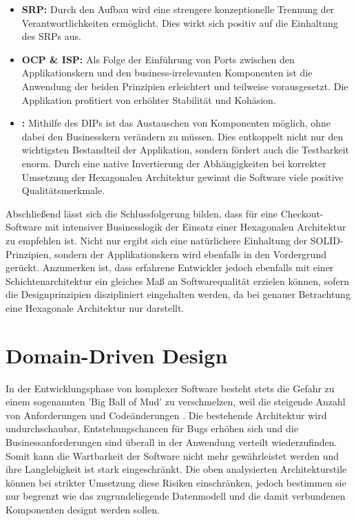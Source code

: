 \begin{itemize}[noitemsep,nolistsep,topsep=-2pt]
	\item \textbf{\acrshort{SRP}: } {Durch den Aufbau wird eine strengere konzeptionelle Trennung der Verantwortlichkeiten ermöglicht. Dies wirkt sich positiv auf die Einhaltung des \acrlong{SRP}s aus.}
	\item \textbf{\acrshort{OCP} \& \acrshort{ISP}: } {Als Folge der Einführung von Ports zwischen den Applikationskern und den business-irrelevanten Komponenten ist die Anwendung der beiden Prinzipien erleichtert und teilweise vorausgesetzt. Die Applikation profitiert von erhöhter Stabilität und Kohäsion. }
	\item \textbf{: } {Mithilfe des \acrlong{DIP}s ist das Austauschen von Komponenten möglich, ohne dabei den Businesskern verändern zu müssen. Dies entkoppelt nicht nur den wichtigsten Bestandteil der Applikation, sondern fördert auch die Testbarkeit enorm. Durch eine native Invertierung der Abhängigkeiten bei korrekter Umsetzung der Hexagonalen Architektur gewinnt die Software viele positive Qualitätsmerkmale.}
\end{itemize}


Abschließend lässt sich die Schlussfolgerung bilden, dass für eine Checkout-Software mit intensiver Businesslogik der Einsatz einer Hexagonalen Architektur zu empfehlen ist. Nicht nur ergibt sich eine natürlichere Einhaltung der SOLID-Prinzipien, sondern der Applikationskern wird ebenfalls in den Vordergrund gerückt. Anzumerken ist, dass erfahrene Entwickler jedoch ebenfalls mit einer Schichtenarchitektur ein gleiches Maß an Softwarequalität erzielen können, sofern die Designprinzipien diszipliniert eingehalten werden, da bei genauer Betrachtung eine Hexagonale Architektur nur  darstellt. 

\section{Domain-Driven Design}

In der Entwicklungsphase von komplexer Software besteht stets die Gefahr zu einem sogenannten 'Big Ball of Mud' zu verschmelzen, weil die steigende Anzahl von Anforderungen und Codeänderungen . Die bestehende Architektur wird undurchschaubar, Entstehungschancen für Bugs erhöhen sich und die Businessanforderungen sind überall in der Anwendung verteilt wiederzufinden. Somit kann die Wartbarkeit der Software nicht mehr gewährleistet werden und ihre Langlebigkeit ist stark eingeschränkt. Die oben analysierten Architekturstile können bei strikter Umsetzung diese Risiken einschränken, jedoch bestimmen sie nur begrenzt wie das zugrundeliegende Datenmodell und die damit verbundenen Komponenten designt werden sollen. 

